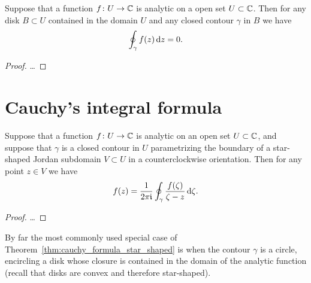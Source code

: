 \begin{corollary}
  \label{cor:local_cauchy_theorem}
  Suppose that a function $f \colon U \to \mathbb{C}$ is analytic on a open
  set $U \subset \mathbb{C}$.
  Then for any disk $B \subset U$ contained in the domain $U$
  and any closed contour $\gamma$ in $B$ we have
  \begin{align*}
    \oint_\gamma f(z) \, \mathrm{d} z = 0 .
  \end{align*}
\end{corollary}
\begin{proof}
  \ldots
\end{proof}



\section{Cauchy's integral formula}

\begin{theorem}
  \label{thm:cauchy_formula_star_shaped}
  Suppose that a function $f \colon U \to \mathbb{C}$ is analytic on an open
  set $U \subset \mathbb{C}$, and suppose that $\gamma$ is a closed contour
  in $U$ parametrizing the boundary of a star-shaped Jordan subdomain
  $V \subset U$ in a counterclockwise orientation.
  Then for any point $z \in V$ we have
  \begin{align*}
    f(z) = \frac{1}{2\pi \mathfrak{i}} \oint_\gamma \frac{f(\zeta)}{\zeta - z} \, \mathrm{d} \zeta .
  \end{align*}
\end{theorem}
\begin{proof}
  \ldots
\end{proof}

By far the most commonly used special case of
Theorem~\ref{thm:cauchy_formula_star_shaped}
is when the contour $\gamma$ is a circle, encircling a disk
whose closure is contained in the domain of the analytic function
(recall that disks are convex and therefore star-shaped).

